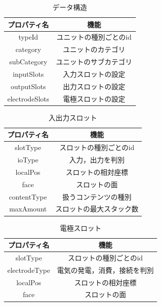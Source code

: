 \documentclass[uplatex,dvipdfmx,report]{jlreq}
\begin{document}
\begin{table}[H]
    \centering
    \caption{データ構造}
    \begin{tabular}{cc}
        \hline
        プロパティ名 & 機能 \\
        \hline
        \hline
        typeId & ユニットの種別ごとのid \\
        category & ユニットのカテゴリ \\
        subCategory & ユニットのサブカテゴリ \\
        inputSlots & 入力スロットの設定 \\
        outputSlots & 出力スロットの設定 \\
        electrodeSlots & 電極スロットの設定 \\
        \hline
    \end{tabular}
\end{table}

\begin{table}[H]
    \centering
    \caption{入出力スロット}
    \begin{tabular}{cc}
        \hline
        プロパティ名 & 機能 \\
        \hline
        \hline
        slotType & スロットの種別ごとのid \\
        ioType & 入力，出力を判別 \\
        localPos & スロットの相対座標 \\
        face & スロットの面 \\
        contentType & 扱うコンテンツの種別 \\
        maxAmount & スロットの最大スタック数 \\
        \hline
    \end{tabular}
\end{table}

\begin{table}[H]
    \centering
    \caption{電極スロット}
    \begin{tabular}{cc}
        \hline
        プロパティ名 & 機能 \\
        \hline
        \hline
        slotType & スロットの種別ごとのid \\
        electrodeType & 電気の発電，消費，接続を判別 \\
        localPos & スロットの相対座標 \\
        face & スロットの面 \\
        \hline
    \end{tabular}
\end{table}
\end{document}
